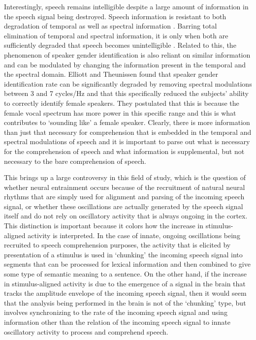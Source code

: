 \documentclass[titlepage]{article}
\begin{document}
    Interestingly, speech remains intelligible despite a large amount of
    information in the speech signal being destroyed. Speech information is
    resistant to both degradation of temporal as well as spectral information
    \cite{Silipo1999,Drullman1994}. Barring total elimination of temporal and
    spectral information, it is only when both are sufficiently degraded that
    speech becomes unintelligible \cite{Elliott2009}. Related to this, the
    phenomenon of speaker gender identification is also reliant on similar
    information and can be modulated by changing the information present in the
    temporal and the spectral domain. Elliott and Theunissen \cite{Elliott2009}
    found that speaker gender identification rate can be significantly
    degraded by removing spectral modulations between 3 and 7 cycles/Hz and that
    this specifically reduced the subjects' ability to correctly identify
    female speakers. They postulated that this is because the female vocal
    spectrum has more power in this specific range and this is what
    contributes to `sounding like' a female speaker. Clearly, there is more
    information than just that necessary for comprehension that is embedded
    in the temporal and spectral modulations of speech and it is important to
    parse out what is necessary for the comprehension of speech and what
    information is supplemental, but not necessary to the bare comprehension
    of speech.

    This brings up a large controversy in this field of study, which is the
    question of whether neural entrainment occurs because of the recruitment of
    natural neural rhythms that are simply used for alignment and parsing of the
    incoming speech signal, or whether these oscillations are actually
    generated by the speech signal itself and do not rely on oscillatory
    activity that is always ongoing in the cortex. This distinction is
    important because it colors how the increase in stimulus-aligned activity
    is interpreted. In the case of innate, ongoing oscillations being recruited
    to speech comprehension purposes, the activity that is elicited by
    presentation of a stimulus is used in `chunking' the incoming speech signal
    into segments that can be processed for lexical information and then
    combined to give some type of semantic meaning to a sentence. On the other
    hand, if the increase in stimulus-aligned activity is due to the
    emergence of a signal in the brain that tracks the amplitude envelope of
    the incoming speech signal, then it would seem that the analysis being
    performed in the brain is not of the `chunking' type, but involves
    synchronizing to the rate of the incoming speech signal and using
    information other than the relation of the incoming speech signal to
    innate oscillatory activity to process and comprehend speech.
\end{document}

